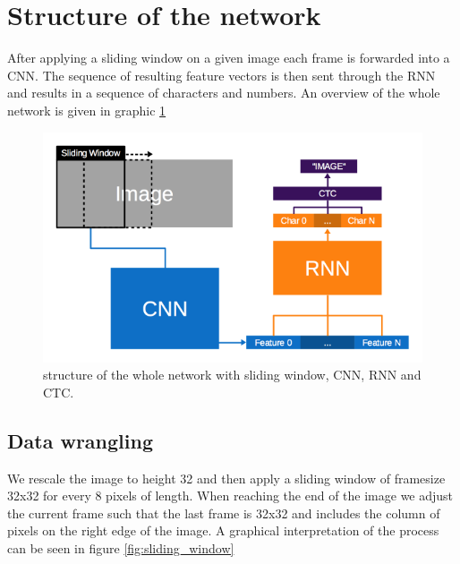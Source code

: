 \documentclass{utue} %
\begin{document}
\section{Structure of the network}
After applying a sliding window on a given image each frame is forwarded into a CNN. The sequence of resulting feature vectors is then sent through the RNN and results in a sequence of characters and numbers. An overview of the whole network is given in graphic \ref{fig:model_general}

\begin{figure}[h!]
	\centering
	\includegraphics[width=.9\columnwidth]{graphics/model_general.png}
	\caption{\label{fig:model_general} \footnotesize{structure of the whole network with sliding window, CNN, RNN and CTC.}}
\end{figure}

\subsection{Data wrangling}
We rescale the image to height 32 and then apply a sliding window of framesize 32x32 for every 8 pixels of length. When reaching the end of the image we adjust the current frame such that the last frame is 32x32 and includes the column of pixels on the right edge of the image. A graphical interpretation of the process can be seen in figure \ref{fig:sliding_window}
\end{document}
